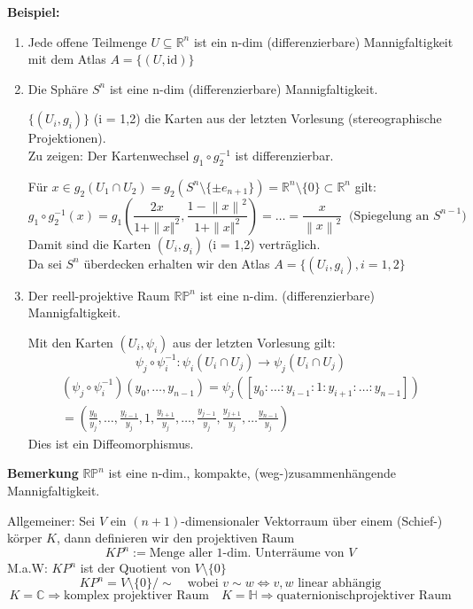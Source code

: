 \documentclass[fleqn, 12pt, letterpaper]{article}
\newcommand\norm[1]{\left\lVert#1\right\rVert}
\begin{document}
\textbf{Beispiel:}
\begin{enumerate}
  \item Jede offene Teilmenge $U \subseteq \mathbb{R}^n$ ist ein n-dim (differenzierbare) Mannigfaltigkeit mit dem Atlas $A = \{(U, \text{id})\}$
  \item Die Sphäre $S^n$ ist eine n-dim (differenzierbare) Mannigfaltigkeit.

  $\{(U_i, g_i)\}$ (i = 1,2) die Karten aus der letzten Vorlesung (stereographische Projektionen).\\

  Zu zeigen: Der Kartenwechsel $g_1\circ g_2^{-1}$ ist differenzierbar.

  Für $x \in g_2(U_1\cap U_2)= g_2(S^n\setminus \{\pm e_{n+1}\})= \mathbb{R}^{n}\setminus \{0\} \subset  \mathbb{R}^{n}$ gilt:
  \[
    g_1 \circ g_2^{-1}(x) = g_1(\frac{2x}{1+\| x\Vert ^2},\frac{1-\norm{x}^2 }{1+\| x\Vert ^2}) =\dots=\frac{x}{\norm{x}^2}\;\; \text{(Spiegelung an $S^{n-1}$)}
  \]
  Damit sind die Karten $(U_i, g_i)$ (i = 1,2) verträglich.\\
  Da sei $S^n$ überdecken erhalten wir den Atlas $A = \{(U_i, g_i), i = 1,2\}$
  \item Der reell-projektive Raum $\mathbb{RP}^n$ ist eine n-dim. (differenzierbare) Mannigfaltigkeit.

  Mit den Karten $(U_i, \psi_i)$ aus der letzten Vorlesung gilt:
  \[
    \psi_j \circ \psi_i^{-1} : \psi_i(U_i \cap U_j) \to \psi_j(U_i \cap U_j)
  \]
  \begin{align*}
    (\psi_j \circ \psi_i^{-1})(y_0, \dots, y_{n-1}) = \psi_j \left( [y_0 : \dots : y_{i-1} : 1 : y_{i+1} : \dots : y_{n-1}] \right)\\
    = \left( \frac{y_0}{y_j}, \dots, \frac{y_{i-1}}{y_j}, 1, \frac{y_{i+1}}{y_j}, \dots,\frac{y_{j-1}}{y_j}, \frac{y_{j+1}}{y_j}, \dots \frac{y_{n-1}}{y_j} \right)
  \end{align*}
  Dies ist ein Diffeomorphismus.
\end{enumerate}
\textbf{Bemerkung} $\mathbb{RP}^n$ ist eine n-dim., kompakte, (weg-)zusammenhängende Mannigfaltigkeit.

Allgemeiner: Sei $V$ ein $(n+1)$-dimensionaler Vektorraum über einem (Schief-) körper $K$, dann definieren wir den projektiven Raum
\[
  KP^n := \text{Menge aller 1-dim. Unterräume von } V
\]
M.a.W: $KP^n$ ist der Quotient von $V\setminus \{0\}$\[
  KP^n = V \setminus \{0\} / \sim \quad \text{wobei } v \sim w \Leftrightarrow v,w \text{ linear abhängig}
\]
\[
  K = \mathbb{C} \Rightarrow \text{komplex projektiver Raum}\quad K = \mathbb{H} \Rightarrow \text{quaternionischprojektiver Raum}
\]
\end{document}
